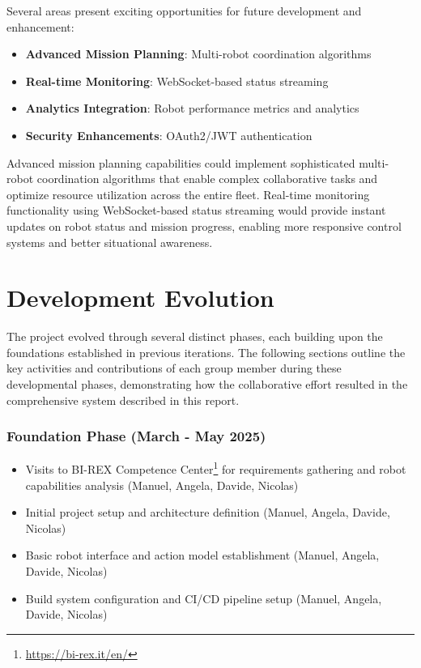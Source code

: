 \documentclass[runningheads]{llncs}
\begin{document}
Several areas present exciting opportunities for future development and enhancement:

\begin{itemize}
    \item \textbf{Advanced Mission Planning}: Multi-robot coordination algorithms
    \item \textbf{Real-time Monitoring}: WebSocket-based status streaming
    \item \textbf{Analytics Integration}: Robot performance metrics and analytics
    \item \textbf{Security Enhancements}: OAuth2/JWT authentication
\end{itemize}

Advanced mission planning capabilities could implement sophisticated multi-robot coordination algorithms that enable complex collaborative tasks and optimize resource utilization across the entire fleet. Real-time monitoring functionality using WebSocket-based status streaming would provide instant updates on robot status and mission progress, enabling more responsive control systems and better situational awareness.

\section{Development Evolution}

The project evolved through several distinct phases, each building upon the foundations established in previous iterations. The following sections outline the key activities and contributions of each group member during these developmental phases, demonstrating how the collaborative effort resulted in the comprehensive system described in this report.

%
%
%
\subsubsection{Foundation Phase (March - May 2025)}

\begin{itemize}
    \item Visits to BI-REX Competence Center\footnote{\url{https://bi-rex.it/en/}} for requirements gathering and robot capabilities analysis (Manuel, Angela, Davide, Nicolas)
    \item Initial project setup and architecture definition (Manuel, Angela, Davide, Nicolas)
    \item Basic robot interface and action model establishment (Manuel, Angela, Davide, Nicolas)
    \item Build system configuration and CI/CD pipeline setup (Manuel, Angela, Davide, Nicolas)
\end{itemize}
\end{document}
